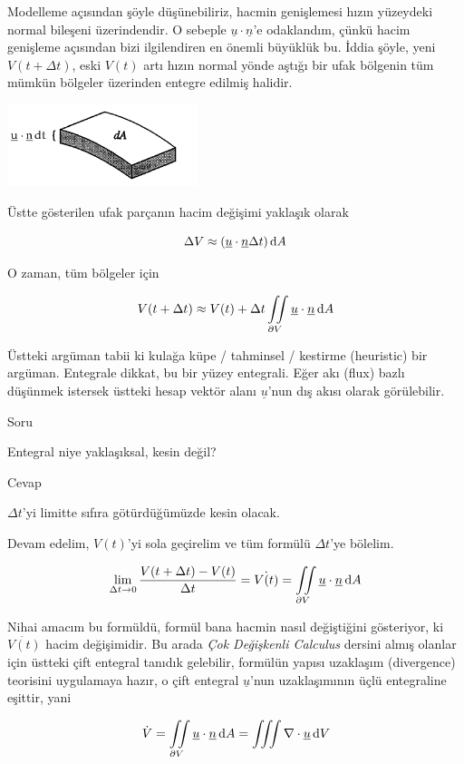 \documentclass[12pt,fleqn]{article}\usepackage{../../common}
\begin{document}
Modelleme açısından şöyle düşünebiliriz, hacmin genişlemesi hızın yüzeydeki
normal bileşeni üzerindendir. O sebeple $\underline{u} \cdot \underline{n}$'e
odaklandım, çünkü hacim genişleme açısından bizi ilgilendiren en önemli
büyüklük bu. İddia şöyle, yeni $V(t + \Delta t)$, eski $V(t)$ artı hızın
normal yönde aştığı bir ufak bölgenin tüm mümkün bölgeler üzerinden entegre
edilmiş halidir.

\includegraphics[width=15em]{16_04.png}

Üstte gösterilen ufak parçanın hacim değişimi yaklaşık olarak

$$ 
\Delta V \approx (\underline{u} \cdot \underline{n} \Delta t) \,\mathrm{d} A
$$

O zaman, tüm bölgeler için

$$ 
V(t + \Delta t) \approx V(t) + 
\Delta t \iint\limits_{\partial V} \underline{u} \cdot \underline{n} \,\mathrm{d} A
$$

Üstteki argüman tabii ki kulağa küpe / tahminsel / kestirme (heuristic) bir
argüman. Entegrale dikkat, bu bir yüzey entegrali. Eğer akı (flux) bazlı
düşünmek istersek üstteki hesap vektör alanı $\underline{u}$'nun dış akısı
olarak görülebilir.

Soru

Entegral niye yaklaşıksal, kesin değil? 

Cevap

$\Delta t$'yi limitte sıfıra götürdüğümüzde kesin olacak. 

Devam edelim, $V(t)$'yi sola geçirelim ve tüm formülü $\Delta t$'ye
bölelim.

$$ 
\lim _{\Delta t \to 0} \frac{ V(t + \Delta t) - V(t)}{\Delta t} = \dot{V(t)} =
\iint\limits_{\partial V} \underline{u} \cdot \underline{n} \,\mathrm{d} A
$$

Nihai amacım bu formüldü, formül bana hacmin nasıl değiştiğini gösteriyor,
ki $\dot{V(t)}$ hacim değişimidir. Bu arada {\em Çok Değişkenli Calculus}
dersini almış olanlar için üstteki çift entegral tanıdık gelebilir,
formülün yapısı uzaklaşım (divergence) teorisini uygulamaya hazır, o çift
entegral $\underline{u}$'nun uzaklaşımının üçlü entegraline eşittir, yani

$$ 
\dot{V} = 
\iint\limits_{\partial V}  \underline{u} \cdot \underline{n} \,\mathrm{d} A = 
\iiint \nabla \cdot \underline{u} \,\mathrm{d} V
$$
\end{document}
